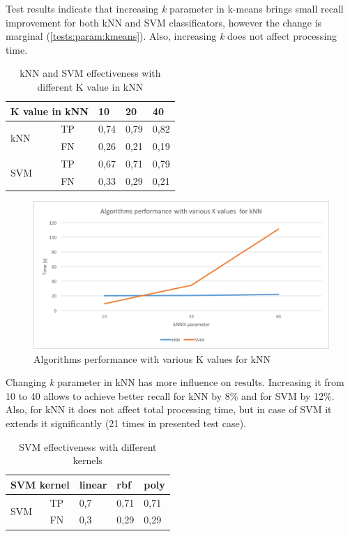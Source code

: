 Test results indicate that increasing \textit{k} parameter in k-means brings small recall improvement for both kNN and SVM classificators, however the change is marginal (\ref{tests:param:kmeans}). Also, increasing \textit{k} does not affect processing time.

\begin{table}[H]
	\centering
	\caption{kNN and SVM effectiveness with different K value in kNN}
	\label{tests:param:knn}
	\begin{tabular}{@{}lllll@{}}
		\toprule
		\multicolumn{2}{l}{K value in kNN} & 10   & 20   & 40   \\ \midrule
		\multirow{2}{*}{kNN}      & TP      & 0,74 & 0,79 & 0,82 \\
		& FN      & 0,26 & 0,21 & 0,19 \\
		\multirow{2}{*}{SVM}      & TP      & 0,67 & 0,71 & 0,79 \\
		& FN      & 0,33 & 0,29 & 0,21 \\ \bottomrule
	\end{tabular}
\end{table}

\begin{figure}[H]
	\begin{center}
		\includegraphics[width=0.9\linewidth]{images/tests/param-knn.png}
		\caption{Algorithms performance with various K values for kNN}
		\label{param-knn}
	\end{center}
\end{figure}

Changing \textit{k} parameter in kNN has more influence on results. Increasing it from 10 to 40 allows to achieve better recall for kNN by 8\% and for SVM by 12\%. Also, for kNN it does not affect total processing time, but in case of SVM it extends it significantly (21 times in presented test case).

\begin{table}[H]
	\centering
	\caption{SVM effectiveness with different kernels}
	\label{tests:param:svm}
	\begin{tabular}{@{}lllll@{}}
		\toprule
		\multicolumn{2}{l}{SVM kernel} & linear & rbf  & poly \\ \midrule
		\multirow{2}{*}{SVM}    & TP   & 0,7    & 0,71 & 0,71 \\
		& FN   & 0,3    & 0,29 & 0,29 \\ \bottomrule
	\end{tabular}
\end{table}

